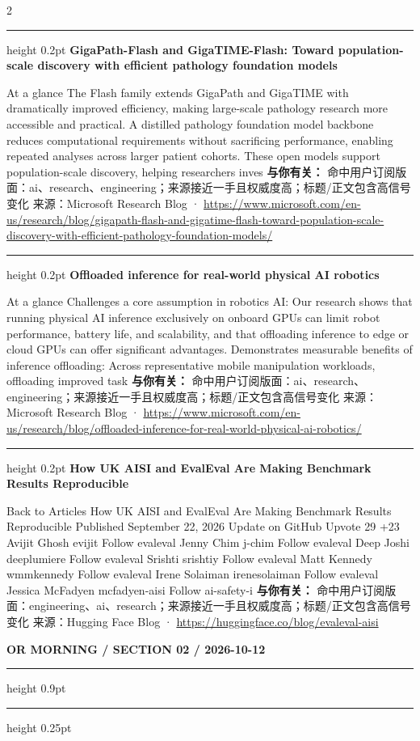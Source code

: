 \documentclass[10.5pt]{ctexart}
\begin{document}
\begin{multicols}{2}
\vspace{2mm}
\hrule height 0.2pt
\vspace{2mm}
{\large\bfseries GigaPath-Flash and GigaTIME-Flash: Toward population-scale discovery with efficient pathology foundation models}\par
At a glance The Flash family extends GigaPath and GigaTIME with dramatically improved efficiency, making large-scale pathology research more accessible and practical. A distilled pathology foundation model backbone reduces computational requirements without sacrificing performance, enabling repeated analyses across larger patient cohorts. These open models support population-scale discovery, helping researchers inves
\textbf{与你有关：} 命中用户订阅版面：ai、research、engineering；来源接近一手且权威度高；标题/正文包含高信号变化
{\footnotesize\color{ormuted} 来源：Microsoft Research Blog · \url{https://www.microsoft.com/en-us/research/blog/gigapath-flash-and-gigatime-flash-toward-population-scale-discovery-with-efficient-pathology-foundation-models/}}
\vspace{2mm}
\hrule height 0.2pt
\vspace{2mm}
{\large\bfseries Offloaded inference for real-world physical AI robotics}\par
At a glance Challenges a core assumption in robotics AI: Our research shows that running physical AI inference exclusively on onboard GPUs can limit robot performance, battery life, and scalability, and that offloading inference to edge or cloud GPUs can offer significant advantages. Demonstrates measurable benefits of inference offloading: Across representative mobile manipulation workloads, offloading improved task
\textbf{与你有关：} 命中用户订阅版面：ai、research、engineering；来源接近一手且权威度高；标题/正文包含高信号变化
{\footnotesize\color{ormuted} 来源：Microsoft Research Blog · \url{https://www.microsoft.com/en-us/research/blog/offloaded-inference-for-real-world-physical-ai-robotics/}}
\vspace{2mm}
\hrule height 0.2pt
\vspace{2mm}
{\large\bfseries How UK AISI and EvalEval Are Making Benchmark Results Reproducible}\par
Back to Articles How UK AISI and EvalEval Are Making Benchmark Results Reproducible Published September 22, 2026 Update on GitHub Upvote 29 +23 Avijit Ghosh evijit Follow evaleval Jenny Chim j-chim Follow evaleval Deep Joshi deeplumiere Follow evaleval Srishti srishtiy Follow evaleval Matt Kennedy wmmkennedy Follow evaleval Irene Solaiman irenesolaiman Follow evaleval Jessica McFadyen mcfadyen-aisi Follow ai-safety-i
\textbf{与你有关：} 命中用户订阅版面：engineering、ai、research；来源接近一手且权威度高；标题/正文包含高信号变化
{\footnotesize\color{ormuted} 来源：Hugging Face Blog · \url{https://huggingface.co/blog/evaleval-aisi}}
\end{multicols}
\newpage
{\small\bfseries OR MORNING / SECTION 02 / 2026-10-12}
\vspace{2mm}
\hrule height 0.9pt
\vspace{1.5mm}
\hrule height 0.25pt
\vspace{4mm}
\end{document}
